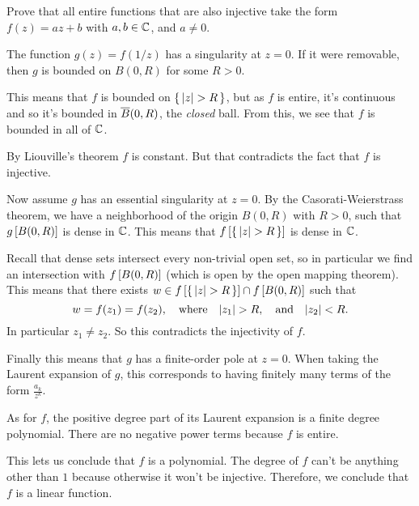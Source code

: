 \documentclass[12pt]{memoir}
\begin{document}
\begin{Ej}
    Prove that all entire functions that are also injective take the form $f (z) = az + b $ with $a, b \in\mathbb{C}$, and $a \neq 0$. 
\end{Ej}

\begin{ptcbr}
The function $g(z)=f(1/z)$ has a singularity at $z=0$. If it were removable, then $g$ is bounded on $B(0,R)$ for some $R>0$.\par 
This means that $f$ is bounded on $\set{|z|>R}$, but as $f$ is entire, it's continuous and so it's bounded in $\overline{B}(0,R)$, the \emph{closed} ball. From this, we see that $f$ is bounded in all of $\mathbb{C}$.\par 
By Liouville's theorem $f$ is constant. But that contradicts the fact that $f$ is injective.\par 
Now assume $g$ has an essential singularity at $z=0$. By the Casorati-Weierstrass theorem, we have a neighborhood of the origin $B(0,R)$ with $R>0$, such that $g\left\lbrack B(0,R)\right\rbrack$ is dense in $\mathbb{C}$. This means that $f\bonj{\set{|z|>R}}$ is dense in $\mathbb{C}$.\par 
Recall that dense sets intersect every non-trivial open set, so in particular we find an intersection with $f\left\lbrack B(0,R)\right\rbrack$ (which is open by the open mapping theorem). This means that there exists $w\in f\bonj{\set{|z|>R}}\cap f\bonj{B(0,R)}$ such that 
$$w=f(z_1)=f(z_2),\word{where}|z_1|>R,\word{and}|z_2|<R.$$
In particular $z_1\neq z_2$. So this contradicts the injectivity of $f$.\par 
Finally this means that $g$ has a finite-order pole at $z=0$. When taking the Laurent expansion of $g$, this corresponds to having finitely many terms of the form $\frac{a_k}{z^k}$.\par 
As for $f$, the positive degree part of its Laurent expansion is a finite degree polynomial. There are no negative power terms because $f$ is entire.\par 
This lets us conclude that $f$ is a polynomial. The degree of $f$ can't be anything other than $1$ because otherwise it won't be injective. Therefore, we conclude that $f$ is a linear function.
\end{ptcbr}
\end{document}
